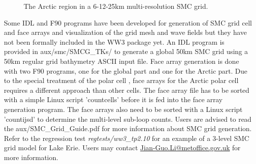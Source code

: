 \begin{figure}
\centerline{}
\caption{The Arctic region in a 6-12-25km multi-resolution SMC grid.}
\label{fig:SMC_Arctic} 
\botline
\end{figure}

Some IDL and F90 programs have been developed for generation of SMC grid cell
and face arrays and visualization of the grid mesh and wave fields but they
have not been formally included in the WW3 package yet. An IDL program is
provided in aux/smc/SMCG\_TKs/ to generate a global 50km SMC grid using a
50km regular grid bathymetry ASCII input file. Face array generation is done
with two F90 programs, one for the global part and one for the Arctic
part. Due to the special treatment of the polar cell \citep{art:Li12}, face
arrays for the Arctic polar cell requires a different approach than other
cells. The face array file has to be sorted with a simple Linux script
'countcells' before it is fed into the face array generation program. The face
arrays also need to be sorted with a Linux script 'countijsd' to determine the
multi-level sub-loop counts. Users are advised to read the
aux/SMC\_Grid\_Guide.pdf for more information about SMC grid generation. Refer
to the regression test \emph{regtests/ww3\_tp2.10} for an example of a 3-level
SMC grid model for Lake Erie. Users may contact
\url{Jian-Guo.Li@metoffice.gov.uk} for more information.
